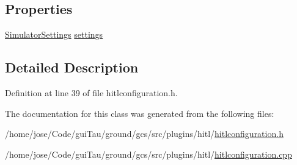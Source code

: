 \subsection*{Properties}
\begin{DoxyCompactItemize}
\item 
\hyperlink{group___h_i_t_l_plugin_ga052199f1328d3002bce3e45345aa7f4e}{Simulator\-Settings} \hyperlink{group___h_i_t_l_plugin_ga961f33f3db5f79daaf792a4999ac5c06}{settings}
\end{DoxyCompactItemize}


\subsection{Detailed Description}


Definition at line 39 of file hitlconfiguration.\-h.



The documentation for this class was generated from the following files\-:\begin{DoxyCompactItemize}
\item 
/home/jose/\-Code/gui\-Tau/ground/gcs/src/plugins/hitl/\hyperlink{hitlconfiguration_8h}{hitlconfiguration.\-h}\item 
/home/jose/\-Code/gui\-Tau/ground/gcs/src/plugins/hitl/\hyperlink{hitlconfiguration_8cpp}{hitlconfiguration.\-cpp}\end{DoxyCompactItemize}
